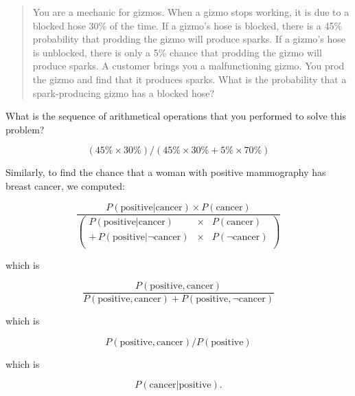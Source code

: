 \hr

\begin{quote}
{
 You are a mechanic for gizmos. When a gizmo stops working, it is
due to a blocked hose 30\% of the time. If a gizmo's
hose is blocked, there is a 45\% probability that prodding the gizmo
will produce sparks. If a gizmo's hose is unblocked,
there is only a 5\% chance that prodding the gizmo will produce sparks.
A customer brings you a malfunctioning gizmo. You prod the gizmo and
find that it produces sparks. What is the probability that a
spark-producing gizmo has a blocked hose?}
\end{quote}

{
 What is the sequence of arithmetical operations that you performed
to solve this problem?}

\begin{equation*}
 (45\% \times 30\%) / (45\% \times 30\% + 5\% \times 70\%)
\end{equation*}

{
 Similarly, to find the chance that a woman with positive
mammography has breast cancer, we computed:}

\begin{equation*}
  \frac{P(\text{positive}|\text{cancer})\times P(\text{cancer})}
       {\left(\begin{array}{rcl}
           P(\text{positive}|\text{cancer}) & \times & P(\text{cancer}) \\
           +\, P(\text{positive}|\lnot \text{cancer}) & \times & P(\lnot \text{cancer}) \\
         \end{array}
         \right)}
\end{equation*}


{
 which is}

\begin{equation*}
  \frac{P(\text{positive},\text{cancer})}
  {P(\text{positive},\text{cancer}) + P(\text{positive},\lnot\text{cancer})}
\end{equation*}

{
 which is}

\begin{equation*}
  P(\text{positive},\text{cancer}) / P(\text{positive})
\end{equation*}


{
 which is}

\begin{equation*}
  P(\text{cancer}|\text{positive}).
\end{equation*}

